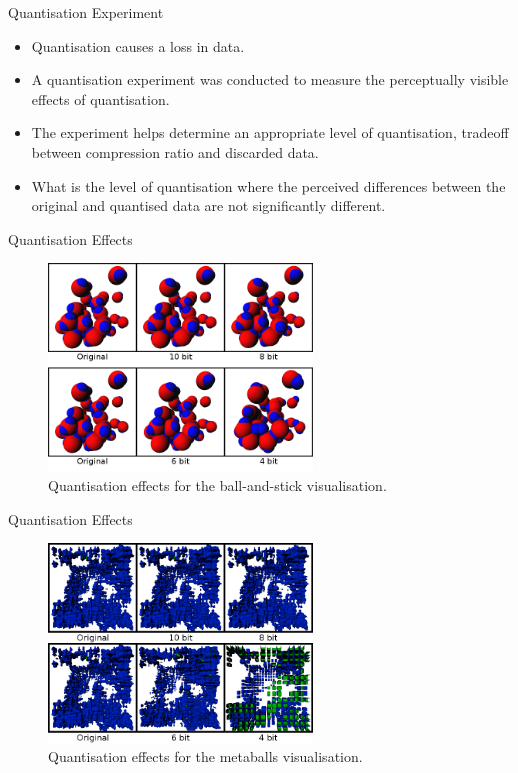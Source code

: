 \documentclass{beamer}
\begin{document}
\begin{frame}{Quantisation Experiment}

\begin{itemize}

  \item Quantisation causes a loss in data.

  \item A quantisation experiment was conducted to measure the perceptually visible effects of quantisation.

  \item The experiment helps determine an appropriate level of quantisation, tradeoff between compression ratio and discarded data.

  \item What is the level of quantisation where the perceived differences between the original and quantised data are not significantly different.

\end{itemize}

\end{frame}

\begin{frame}{Quantisation Effects}
\begin{figure}
  \centering
  \includegraphics[width=70mm]{min-images/ball-and-stick-4680.png}
  \caption{Quantisation effects for the ball-and-stick visualisation.}
\end{figure}
\end{frame}

\begin{frame}{Quantisation Effects}
\begin{figure}
  \centering
  \includegraphics[width=70mm]{min-images/metaballs-4680.png}
  \caption{Quantisation effects for the metaballs visualisation.}
\end{figure}
\end{frame}
\end{document}

